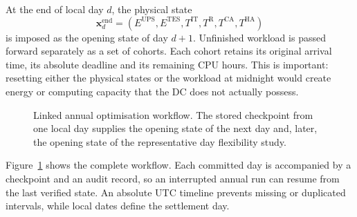 At the end of local day $d$, the physical state
\begin{equation}
 \boldsymbol{x}_{d}^{\mathrm{end}}=
 (E^{\mathrm{UPS}},E^{\mathrm{TES}},T^{\mathrm{IT}},T^{\mathrm{R}},
 T^{\mathrm{CA}},T^{\mathrm{HA}})
 \label{eq:state-vector}
\end{equation}
is imposed as the opening state of day $d+1$. Unfinished workload is passed
forward separately as a set of cohorts. Each cohort retains its original arrival
time, its absolute deadline and its remaining CPU hours. This is important:
resetting either the physical states or the workload at midnight would create
energy or computing capacity that the DC does not actually possess.

\begin{figure}[!t]
\centering
{}
\caption{Linked annual optimisation workflow. The stored checkpoint from one
local day supplies the opening state of the next day and, later, the opening
state of the representative day flexibility study.}
\label{fig:annual-workflow}
\end{figure}

Figure~\ref{fig:annual-workflow} shows the complete workflow. Each committed day
is accompanied by a checkpoint and an audit record, so an interrupted annual run
can resume from the last verified state. An absolute UTC timeline prevents
missing or duplicated intervals, while local dates define the settlement day.

